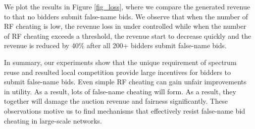 \documentclass{sig-alternate}
\begin{document}
We plot the results in Figure \ref{fig_loss}, where we compare the generated revenue to that no bidders submit false-name bids. We observe that when the number of RF cheating is low, the revenue loss in under controlled while when the number of RF cheating exceeds a threshold, the revenue start to decrease quickly and the revenue is reduced by 40\% after all 200+ bidders submit false-name bids.

In summary, our experiments show that the unique requirement of spectrum reuse and resulted local competition provide large incentives for bidders to submit false-name bids. Even simple RF cheating can gain unfair improvements in utility. As a result, lots of false-name cheating will form. As a result, they together will damage the auction revenue and fairness significantly.  These observations motive us to find mechanisms that effectively resist false-name bid cheating in large-scale networks.



%
%
%
%
\end{document}
